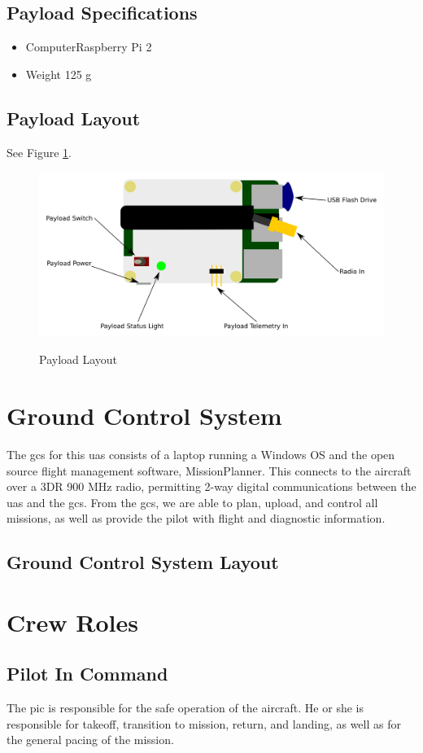 \documentclass{report}
\begin{document}
		\subsection{Payload Specifications}
			\begin{itemize}
				\item Computer\hfill Raspberry Pi 2
				\item Weight \hfill 125 g
			\end{itemize}
		\subsection{Payload Layout}
			See Figure \ref{fig:payload_layout}.
			\begin{figure}[ht]
				\centering
				\caption{Payload Layout}
				\includegraphics[width=\textwidth]{payload_layout.png}
				\label{fig:payload_layout}
			\end{figure}
	\section{Ground Control System}
		The \gls{gcs} for this \gls{uas} consists of a laptop running a Windows OS and the open source flight management software, MissionPlanner.  This connects to the aircraft over a 3DR 900 MHz radio, permitting 2-way digital communications between the \gls{uas} and the \gls{gcs}.  From the \gls{gcs}, we are able to plan, upload, and control all missions, as well as provide the pilot with flight and diagnostic information.
		\subsection{Ground Control System Layout}
	\section{Crew Roles}
		\subsection{Pilot In Command}
			The \gls{pic} is responsible for the safe operation of the aircraft.  He or she is responsible for takeoff, transition to mission, return, and landing, as well as for the general pacing of the mission.
\end{document}
